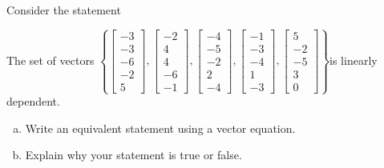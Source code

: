 
\begin{exerciseStatement}


Consider the statement 
\begin{center}\begin{minipage}{0.8\textwidth}
 The set of vectors \( \left\{ \left[\begin{array}{c}
-3 \\
-3 \\
-6 \\
-2 \\
5
\end{array}\right] , \left[\begin{array}{c}
-2 \\
4 \\
4 \\
-6 \\
-1
\end{array}\right] , \left[\begin{array}{c}
-4 \\
-5 \\
-2 \\
2 \\
-4
\end{array}\right] , \left[\begin{array}{c}
-1 \\
-3 \\
-4 \\
1 \\
-3
\end{array}\right] , \left[\begin{array}{c}
5 \\
-2 \\
-5 \\
3 \\
0
\end{array}\right] \right\} \)is linearly dependent.
\end{minipage}\end{center}
    


\begin{enumerate}[(a)]
\item  Write an equivalent statement using a vector equation.
\item  Explain why your statement is true or false.
\end{enumerate}
    
\end{exerciseStatement}
    

